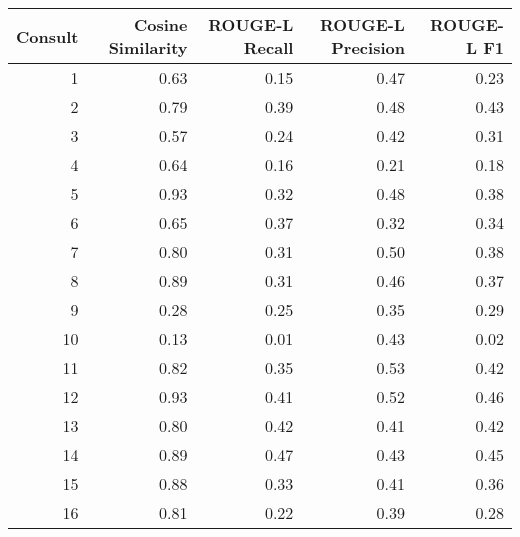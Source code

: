 \begin{tabular}{rrrrr}
\toprule
Consult & Cosine Similarity & ROUGE-L Recall & ROUGE-L Precision & ROUGE-L F1 \\
\midrule
1 & 0.63 & 0.15 & 0.47 & 0.23 \\
2 & 0.79 & 0.39 & 0.48 & 0.43 \\
3 & 0.57 & 0.24 & 0.42 & 0.31 \\
4 & 0.64 & 0.16 & 0.21 & 0.18 \\
5 & 0.93 & 0.32 & 0.48 & 0.38 \\
6 & 0.65 & 0.37 & 0.32 & 0.34 \\
7 & 0.80 & 0.31 & 0.50 & 0.38 \\
8 & 0.89 & 0.31 & 0.46 & 0.37 \\
9 & 0.28 & 0.25 & 0.35 & 0.29 \\
10 & 0.13 & 0.01 & 0.43 & 0.02 \\
11 & 0.82 & 0.35 & 0.53 & 0.42 \\
12 & 0.93 & 0.41 & 0.52 & 0.46 \\
13 & 0.80 & 0.42 & 0.41 & 0.42 \\
14 & 0.89 & 0.47 & 0.43 & 0.45 \\
15 & 0.88 & 0.33 & 0.41 & 0.36 \\
16 & 0.81 & 0.22 & 0.39 & 0.28 \\
\bottomrule
\end{tabular}
